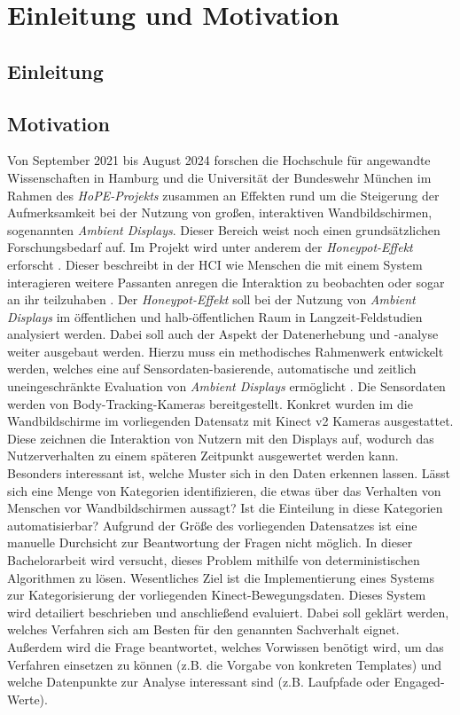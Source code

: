 \chapter{Einleitung und Motivation}
\label{chapter1}

\section{Einleitung}
\label{chapter1-Einleitung}


\section{Motivation}
\label{chapter1-Motivation}
Von September 2021 bis August 2024 forschen die Hochschule für angewandte Wissenschaften in Hamburg
und die Universität der Bundeswehr München im Rahmen des \emph{HoPE-Projekts} zusammen an Effekten
rund um die Steigerung der Aufmerksamkeit bei der Nutzung von großen, interaktiven Wandbildschirmen,
sogenannten \emph{Ambient Displays}.
Dieser Bereich weist noch einen grundsätzlichen Forschungsbedarf auf.
Im Projekt wird unter anderem der \emph{Honeypot-Effekt} erforscht \citep{unibw_honeypot-effekt_2021}.
Dieser beschreibt in der \ac{HCI} wie Menschen die mit einem System interagieren
weitere Passanten anregen die Interaktion zu beobachten oder sogar an ihr teilzuhaben \citep{wouters_uncovering_2016}.
Der \emph{Honeypot-Effekt} soll bei der Nutzung von \emph{Ambient Displays} im öffentlichen
und halb-öffentlichen Raum in Langzeit-Feldstudien analysiert werden.
Dabei soll auch der Aspekt der Datenerhebung und -analyse weiter ausgebaut werden.
Hierzu muss ein methodisches Rahmenwerk entwickelt werden, welches eine auf Sensordaten-basierende,
automatische und zeitlich uneingeschränkte Evaluation von \emph{Ambient Displays} ermöglicht \citep{unibw_honeypot-effekt_2021}.
Die Sensordaten werden von Body-Tracking-Kameras bereitgestellt.
Konkret wurden im die Wandbildschirme im vorliegenden Datensatz mit Kinect v2 Kameras ausgestattet.
Diese zeichnen die Interaktion von Nutzern mit den Displays auf,
wodurch das Nutzerverhalten zu einem späteren Zeitpunkt ausgewertet werden kann.
Besonders interessant ist, welche Muster sich in den Daten erkennen lassen.
Lässt sich eine Menge von Kategorien identifizieren, die etwas über das Verhalten von Menschen vor Wandbildschirmen aussagt?
Ist die Einteilung in diese Kategorien automatisierbar?
Aufgrund der Größe des vorliegenden Datensatzes ist eine manuelle Durchsicht zur Beantwortung der Fragen nicht möglich.
In dieser Bachelorarbeit wird versucht, dieses Problem mithilfe von deterministischen Algorithmen zu lösen.
Wesentliches Ziel ist die Implementierung eines Systems zur Kategorisierung der vorliegenden Kinect-Bewegungsdaten.
Dieses System wird detailiert beschrieben und anschließend evaluiert.
Dabei soll geklärt werden, welches Verfahren sich am Besten für den genannten Sachverhalt eignet.
Außerdem wird die Frage beantwortet, welches Vorwissen benötigt wird,
um das Verfahren einsetzen zu können (z.B. die Vorgabe von konkreten Templates)
und welche Datenpunkte zur Analyse interessant sind (z.B. Laufpfade oder Engaged-Werte).


